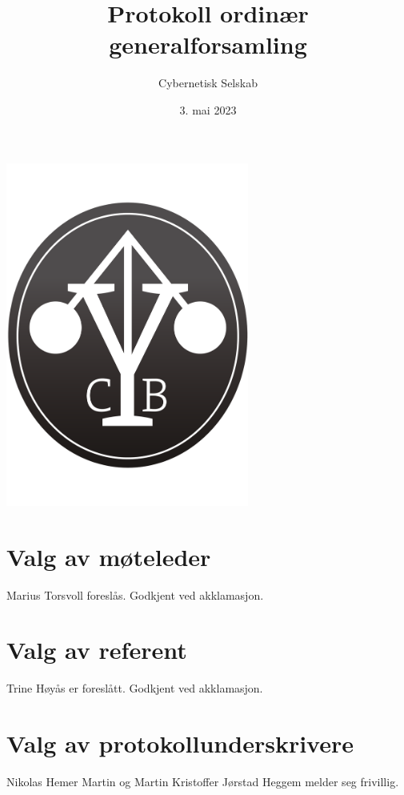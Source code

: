 \documentclass[10pt,norsk,a4paper,usenames,dvipsnames]{article}
\title{\huge Protokoll ordinær generalforsamling}
\author{\LARGE Cybernetisk Selskab}
\date{3. mai 2023}
\begin{document}
\maketitle



\begin{center}


\includegraphics[width=0.6\textwidth,height=0.6\textheight,keepaspectratio=true]{cyblogoa3.pdf}

\end{center}


\newpage


\tableofcontents

\section{Valg av møteleder}
Marius Torsvoll foreslås. Godkjent ved akklamasjon.

\section{Valg av referent}
Trine Høyås er foreslått. Godkjent ved akklamasjon.

\section{Valg av protokollunderskrivere}
Nikolas Hemer Martin og Martin Kristoffer Jørstad Heggem melder seg frivillig.
\end{document}
